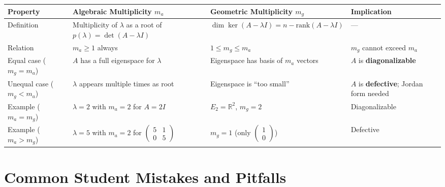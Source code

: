 \documentclass[12pt,a4paper]{article}
\begin{document}
\begin{center}
\begin{tabular}{@{}p{3cm} p{5cm} p{4cm} p{3.5cm}@{}}
\toprule
\textbf{Property} & \textbf{Algebraic Multiplicity $m_a$} & \textbf{Geometric Multiplicity $m_g$} & \textbf{Implication} \\
\midrule
Definition &
  Multiplicity of $\lambda$ as a root of $p(\lambda)=\det(A-\lambda I)$ &
  $\dim\ker(A-\lambda I) = n-\text{rank}(A-\lambda I)$ &
  ---\\
\addlinespace
Relation &
  $m_a \geq 1$ always &
  $1 \leq m_g \leq m_a$ &
  $m_g$ cannot exceed $m_a$ \\
\addlinespace
Equal case ($m_g=m_a$) &
  $A$ has a full eigenspace for $\lambda$ &
  Eigenspace has basis of $m_a$ vectors &
  $A$ is \textbf{diagonalizable} \\
\addlinespace
Unequal case ($m_g < m_a$) &
  $\lambda$ appears multiple times as root &
  Eigenspace is ``too small'' &
  $A$ is \textbf{defective}; Jordan form needed \\
\addlinespace
Example ($m_a=m_g$) &
  $\lambda=2$ with $m_a=2$ for $A=2I$ &
  $E_2=\mathbb{R}^2$, $m_g=2$ &
  Diagonalizable \\
\addlinespace
Example ($m_a>m_g$) &
  $\lambda=5$ with $m_a=2$ for $\begin{pmatrix}5&1\\0&5\end{pmatrix}$ &
  $m_g=1$ (only $\begin{pmatrix}1\\0\end{pmatrix}$) &
  Defective \\
\bottomrule
\end{tabular}
\end{center}

\section{Common Student Mistakes and Pitfalls}
\end{document}
